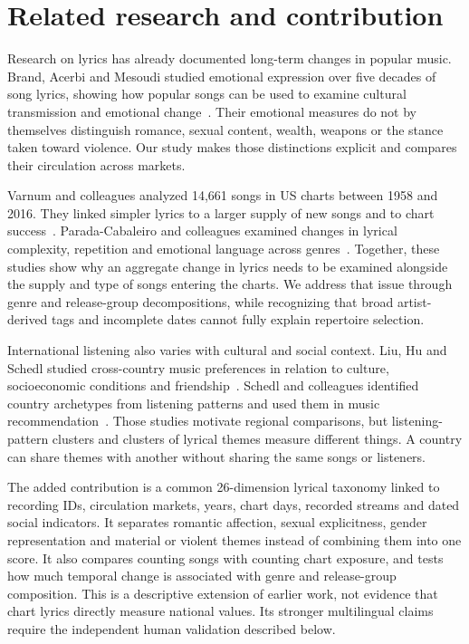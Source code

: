 \section{Related research and contribution}
Research on lyrics has already documented long-term changes in popular music. Brand, Acerbi and Mesoudi studied emotional expression over five decades of song lyrics, showing how popular songs can be used to examine cultural transmission and emotional change~\cite{brand}. Their emotional measures do not by themselves distinguish romance, sexual content, wealth, weapons or the stance taken toward violence. Our study makes those distinctions explicit and compares their circulation across markets.

Varnum and colleagues analyzed 14,661 songs in US charts between 1958 and 2016. They linked simpler lyrics to a larger supply of new songs and to chart success~\cite{varnum}. Parada-Cabaleiro and colleagues examined changes in lyrical complexity, repetition and emotional language across genres~\cite{parada}. Together, these studies show why an aggregate change in lyrics needs to be examined alongside the supply and type of songs entering the charts. We address that issue through genre and release-group decompositions, while recognizing that broad artist-derived tags and incomplete dates cannot fully explain repertoire selection.

International listening also varies with cultural and social context. Liu, Hu and Schedl studied cross-country music preferences in relation to culture, socioeconomic conditions and friendship~\cite{liu}. Schedl and colleagues identified country archetypes from listening patterns and used them in music recommendation~\cite{schedl}. Those studies motivate regional comparisons, but listening-pattern clusters and clusters of lyrical themes measure different things. A country can share themes with another without sharing the same songs or listeners.

The added contribution is a common 26-dimension lyrical taxonomy linked to recording IDs, circulation markets, years, chart days, recorded streams and dated social indicators. It separates romantic affection, sexual explicitness, gender representation and material or violent themes instead of combining them into one score. It also compares counting songs with counting chart exposure, and tests how much temporal change is associated with genre and release-group composition. This is a descriptive extension of earlier work, not evidence that chart lyrics directly measure national values. Its stronger multilingual claims require the independent human validation described below.
